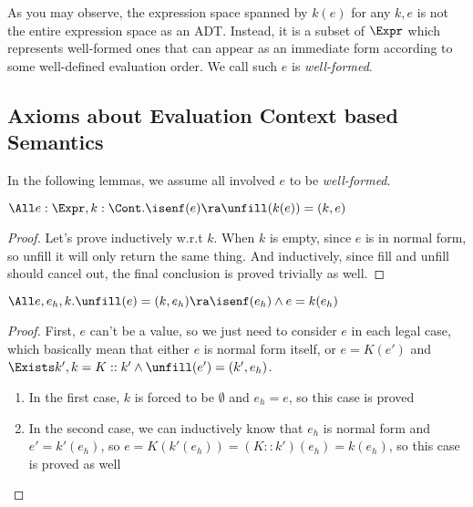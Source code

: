 As you may observe, the expression space spanned by $k(e)$ for any $k, e$ is not the entire
expression space as an ADT. Instead, it is a subset of $\Expr$ which represents well-formed ones
that can appear as an immediate form according to some well-defined evaluation order. We call
such $e$ is \emph{well-formed}.

\subsection{Axioms about Evaluation Context based Semantics}

In the following lemmas, we assume all involved $e$ to be \emph{well-formed}.

\begin{lemma}
$\All e: \Expr, k: \Cont . \isenf(e) \ra \unfill(k(e)) = (k, e)$
\end{lemma}
\begin{proof}

Let's prove inductively w.r.t $k$. When $k$ is empty,
since $e$ is in normal form, so unfill it will only return the same thing.
And inductively, since fill and unfill should cancel out, the final conclusion is proved trivially as well.

\end{proof}

\begin{lemma}
  $\All e, e_h, k. \unfill(e) = (k, e_h) \ra \isenf(e_h) \land e = k(e_h)$
\end{lemma}
\begin{proof}
    First, $e$ can't be a value, so we just need to consider $e$ in each legal case, which basically
    mean that either $e$ is normal form itself, or $e = K(e')$ and $\Exists k', k = K::k' \land \unfill(e') = (k', e_h)$.
    \begin{enumerate}
        \item In the first case, $k$ is forced to be $\emptyset$ and $e_h = e$, so this case is proved
        \item In the second case, we can inductively know that $e_h$ is normal form and $e' = k'(e_h)$,
              so $e = K(k'(e_h)) = (K::k')(e_h) = k(e_h)$, so this case is proved as well
    \end{enumerate}
\end{proof}


